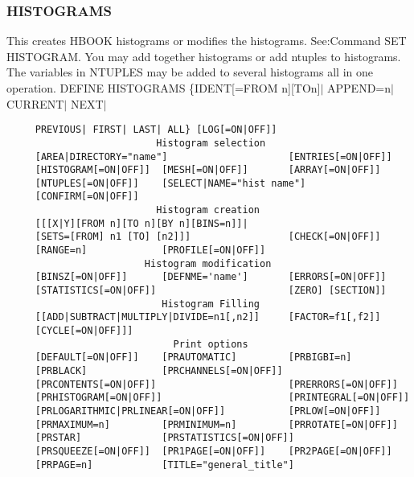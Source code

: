 \subsubsection{HISTOGRAMS}
This   creates   HBOOK   histograms   or   modifies   the   histograms.
See:Command SET HISTOGRAM.  You may  add  together  histograms  or  add
ntuples  to  histograms.   The  variables  in  NTUPLES  may be added to
several histograms all in one operation.  
DEFINE   HISTOGRAMS   \{IDENT[=FROM n][TOn]$|$  APPEND=n$|$  CURRENT$|$  NEXT$|$
\begin{verbatim}
     PREVIOUS| FIRST| LAST| ALL} [LOG[=ON|OFF]] 
                          Histogram selection
     [AREA|DIRECTORY="name"]                     [ENTRIES[=ON|OFF]] 
     [HISTOGRAM[=ON|OFF]]  [MESH[=ON|OFF]]       [ARRAY[=ON|OFF]] 
     [NTUPLES[=ON|OFF]]    [SELECT|NAME="hist name"] 
     [CONFIRM[=ON|OFF]] 
                          Histogram creation
     [[[X|Y][FROM n][TO n][BY n][BINS=n]]| 
     [SETS=[FROM] n1 [TO] [n2]]]                 [CHECK[=ON|OFF]] 
     [RANGE=n]             [PROFILE[=ON|OFF]] 
                        Histogram modification
     [BINSZ[=ON|OFF]]      [DEFNME='name']       [ERRORS[=ON|OFF]] 
     [STATISTICS[=ON|OFF]]                       [ZERO] [SECTION]] 
                           Histogram Filling
     [[ADD|SUBTRACT|MULTIPLY|DIVIDE=n1[,n2]]     [FACTOR=f1[,f2]] 
     [CYCLE[=ON|OFF]]] 
                             Print options
     [DEFAULT[=ON|OFF]]    [PRAUTOMATIC]         [PRBIGBI=n] 
     [PRBLACK]             [PRCHANNELS[=ON|OFF]] 
     [PRCONTENTS[=ON|OFF]]                       [PRERRORS[=ON|OFF]] 
     [PRHISTOGRAM[=ON|OFF]]                      [PRINTEGRAL[=ON|OFF]] 
     [PRLOGARITHMIC|PRLINEAR[=ON|OFF]]           [PRLOW[=ON|OFF]] 
     [PRMAXIMUM=n]         [PRMINIMUM=n]         [PRROTATE[=ON|OFF]] 
     [PRSTAR]              [PRSTATISTICS[=ON|OFF]] 
     [PRSQUEEZE[=ON|OFF]]  [PR1PAGE[=ON|OFF]]    [PR2PAGE[=ON|OFF]] 
     [PRPAGE=n]            [TITLE="general_title"] 
\end{verbatim}
